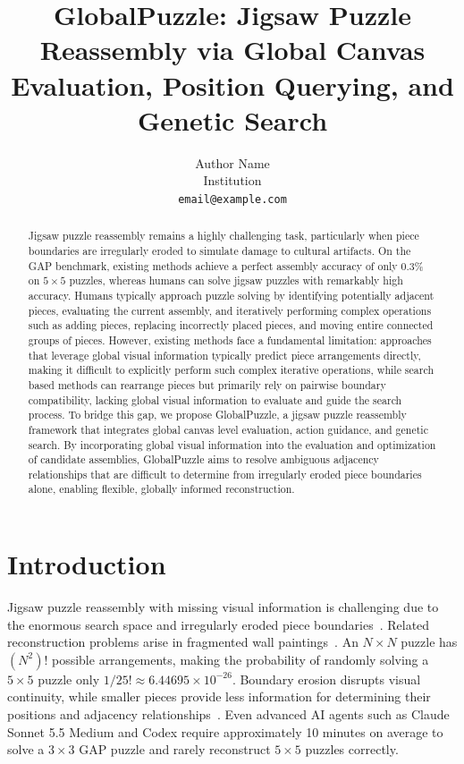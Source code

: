 \documentclass[10pt,twocolumn,letterpaper]{article}
\title{GlobalPuzzle: Jigsaw Puzzle Reassembly via Global Canvas Evaluation, Position Querying, and Genetic Search}
\author{Author Name\\Institution\\{\tt\small email@example.com}}
\begin{document}
\maketitle

\begin{abstract}
Jigsaw puzzle reassembly remains a highly challenging task, particularly when piece boundaries are irregularly eroded to simulate damage to cultural artifacts. On the GAP benchmark, existing methods achieve a perfect assembly accuracy of only 0.3\% on $5\times5$ puzzles, whereas humans can solve jigsaw puzzles with remarkably high accuracy. Humans typically approach puzzle solving by identifying potentially adjacent pieces, evaluating the current assembly, and iteratively performing complex operations such as adding pieces, replacing incorrectly placed pieces, and moving entire connected groups of pieces. However, existing methods face a fundamental limitation: approaches that leverage global visual information typically predict piece arrangements directly, making it difficult to explicitly perform such complex iterative operations, while search based methods can rearrange pieces but primarily rely on pairwise boundary compatibility, lacking global visual information to evaluate and guide the search process.
To bridge this gap, we propose GlobalPuzzle, a jigsaw puzzle reassembly framework that integrates global canvas level evaluation, action guidance, and genetic search. By incorporating global visual information into the evaluation and optimization of candidate assemblies, GlobalPuzzle aims to resolve ambiguous adjacency relationships that are difficult to determine from irregularly eroded piece boundaries alone, enabling flexible, globally informed reconstruction.
\end{abstract}

\section{Introduction}

Jigsaw puzzle reassembly with missing visual information is challenging due to the enormous search space and irregularly eroded piece boundaries~\cite{shahar2026gap}.
Related reconstruction problems arise in fragmented wall paintings~\cite{sizikova2018wall}.
An $N \times N$ puzzle has $(N^2)!$ possible arrangements, making the probability of randomly solving a $5 \times 5$ puzzle only $1/25! \approx 6.44695 \times 10^{-26}$.
Boundary erosion disrupts visual continuity, while smaller pieces provide less information for determining their positions and adjacency relationships~\cite{bridger2020eroded,son2016consensus,paumard2020deepzzle}.
Even advanced AI agents such as Claude Sonnet 5.5 Medium and Codex require approximately 10 minutes on average to solve a $3 \times 3$ GAP puzzle and rarely reconstruct $5 \times 5$ puzzles correctly.
\end{document}
